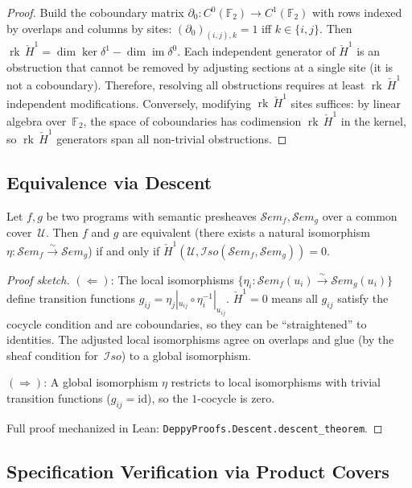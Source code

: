 \documentclass[acmsmall,screen,review,anonymous]{acmart}
\theoremstyle{remark}
\newcommand{\Sem}{\mathcal{S}\mathit{em}}
\newcommand{\Hc}[1]{\check{H}^{#1}}
\newcommand{\Iso}{\mathcal{I}\mathit{so}}
\newcommand{\rk}{\operatorname{rk}}
\newcommand{\im}{\operatorname{im}}
\newcommand{\GF}{\mathbb{F}}
\begin{document}
\begin{proof}
Build the coboundary matrix $\partial_0 : C^0(\GF_2) \to C^1(\GF_2)$
with rows indexed by overlaps and columns by sites:
$(\partial_0)_{(i,j),k} = 1$ iff $k \in \{i,j\}$.
Then $\rk\,\Hc{1} = \dim\ker\delta^1 - \dim\im\delta^0$.
Each independent generator of $\Hc{1}$ is an obstruction that cannot
be removed by adjusting sections at a single site (it is not a
coboundary).  Therefore, resolving all obstructions requires at least
$\rk\,\Hc{1}$ independent modifications.  Conversely, modifying
$\rk\,\Hc{1}$ sites suffices: by linear algebra over~$\GF_2$,
the space of coboundaries has codimension $\rk\,\Hc{1}$ in the
kernel, so $\rk\,\Hc{1}$ generators span all non-trivial
obstructions.
\end{proof}

\subsection{Equivalence via Descent}\label{sec:equiv}

\begin{theorem}\label{thm:descent}
Let $f, g$ be two programs with semantic presheaves $\Sem_f, \Sem_g$
over a common cover~$\mathcal{U}$.  Then $f$ and $g$ are equivalent
(there exists a natural isomorphism $\eta : \Sem_f \xrightarrow{\sim}
\Sem_g$) if and only if $\Hc{1}(\mathcal{U}, \Iso(\Sem_f, \Sem_g)) = 0$.
\end{theorem}

\begin{proof}[Proof sketch]
$(\Leftarrow)$: The local isomorphisms $\{\eta_i : \Sem_f(u_i)
\xrightarrow{\sim} \Sem_g(u_i)\}$ define transition functions
$g_{ij} = \eta_j|_{u_{ij}} \circ \eta_i^{-1}|_{u_{ij}}$.
$\Hc{1} = 0$ means all $g_{ij}$ satisfy the cocycle condition and are
coboundaries, so they can be ``straightened'' to identities.  The
adjusted local isomorphisms agree on overlaps and glue (by the sheaf
condition for~$\Iso$) to a global isomorphism.

$(\Rightarrow)$: A global isomorphism $\eta$ restricts to local
isomorphisms with trivial transition functions ($g_{ij} = \mathrm{id}$),
so the $1$-cocycle is zero.

Full proof mechanized in Lean: \texttt{DeppyProofs.Descent.descent\_theorem}.
\end{proof}

\subsection{Specification Verification via Product Covers}%
\label{sec:spec}
\end{document}
